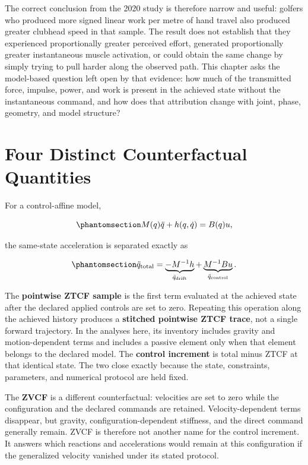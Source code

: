 \documentclass[
  letterpaper,
]{report}
\begin{document}
The correct conclusion from the 2020 study is therefore narrow and
useful: golfers who produced more signed linear work per metre of hand
travel also produced greater clubhead speed in that sample. The result
does not establish that they experienced proportionally greater
perceived effort, generated proportionally greater instantaneous muscle
activation, or could obtain the same change by simply trying to pull
harder along the observed path. This chapter asks the model-based
question left open by that evidence: how much of the transmitted force,
impulse, power, and work is present in the achieved state without the
instantaneous command, and how does that attribution change with joint,
phase, geometry, and model structure?

\section{Four Distinct Counterfactual
Quantities}\label{sec-four-counterfactuals}

For a control-affine model,

\begin{equation}\phantomsection\label{eq-hand-path-dynamics}{
M(q)\ddot q+h(q,\dot q)=B(q)u,
}\end{equation}

the same-state acceleration is separated exactly as

\begin{equation}\phantomsection\label{eq-hand-path-drift-control}{
\ddot q_{\mathrm{total}}
=\underbrace{-M^{-1}h}_{\ddot q_{\mathrm{drift}}}
+\underbrace{M^{-1}Bu}_{\ddot q_{\mathrm{control}}}.
}\end{equation}

The \textbf{pointwise ZTCF sample} is the first term evaluated at the
achieved state after the declared applied controls are set to zero.
Repeating this operation along the achieved history produces a
\textbf{stitched pointwise ZTCF trace}, not a single forward trajectory.
In the analyses here, its inventory includes gravity and
motion-dependent terms and includes a passive element only when that
element belongs to the declared model. The \textbf{control increment} is
total minus ZTCF at that identical state. The two close exactly because
the state, constraints, parameters, and numerical protocol are held
fixed.

The \textbf{ZVCF} is a different counterfactual: velocities are set to
zero while the configuration and the declared commands are retained.
Velocity-dependent terms disappear, but gravity, configuration-dependent
stiffness, and the direct command generally remain. ZVCF is therefore
not another name for the control increment. It answers which reactions
and accelerations would remain at this configuration if the generalized
velocity vanished under its stated protocol.
\end{document}
